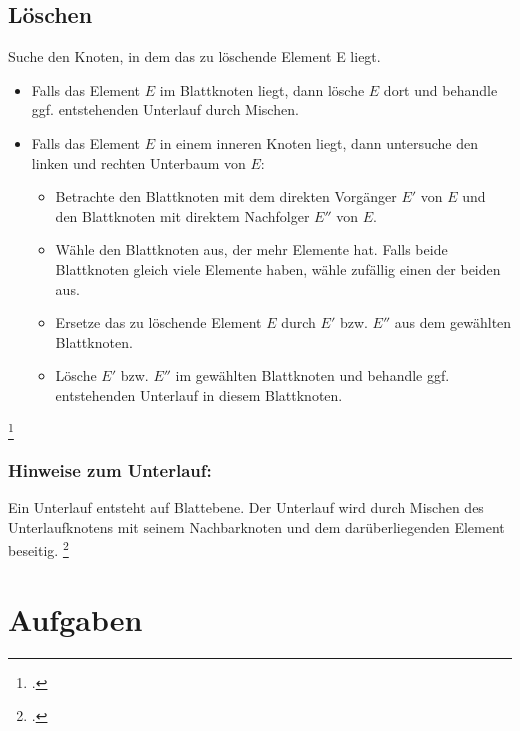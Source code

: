 \documentclass{lehramt-informatik}
\begin{document}
\section{Löschen}

Suche den Knoten, in dem das zu löschende Element E liegt.

\begin{itemize}
\item Falls das Element $E$ im Blattknoten liegt, dann lösche $E$ dort
und behandle ggf. entstehenden Unterlauf durch Mischen.

\item Falls das Element $E$ in einem inneren Knoten liegt, dann
untersuche den linken und rechten Unterbaum von $E$:

\begin{itemize}
\item Betrachte den Blattknoten mit dem direkten Vorgänger $E'$ von $E$
und den Blattknoten mit direktem Nachfolger $E''$ von $E$.

\item Wähle den Blattknoten aus, der mehr Elemente hat. Falls beide
Blattknoten gleich viele Elemente haben, wähle zufällig einen der beiden
aus.

\item Ersetze das zu löschende Element $E$ durch $E'$ bzw. $E''$ aus dem
gewählten Blattknoten.

\item Lösche $E'$ bzw. $E''$ im gewählten Blattknoten und behandle ggf.
entstehenden Unterlauf in diesem Blattknoten.
\end{itemize}
\end{itemize}

\footcite[Seite 39 (PDF 32)]{aud:fs:5}

\subsection{Hinweise zum Unterlauf:}

Ein Unterlauf entsteht auf Blattebene. Der Unterlauf wird durch Mischen
des Unterlaufknotens mit seinem Nachbarknoten und dem darüberliegenden
Element beseitig.
\footcite[Seite 40 (PDF 33)]{aud:fs:5}


\chapter{Aufgaben}
\end{document}
